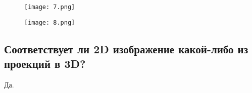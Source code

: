 \begin{figure}[h]
\centering
    \texttt{[image: 7.png]}
  \label{sec:purpose:payings}
\end{figure}

\begin{figure}[h]
\centering
    \texttt{[image: 8.png]}
  \label{sec:purpose:payings}
\end{figure}

\subsection{Соответствует ли 2D изображение какой-либо из проекций в 3D?}

Да.


